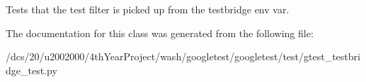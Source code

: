 \begin{DoxyVerb}Tests that the test filter is picked up from the testbridge env var.\end{DoxyVerb}
 

The documentation for this class was generated from the following file\+:\begin{DoxyCompactItemize}
\item 
/dcs/20/u2002000/4th\+Year\+Project/wash/googletest/googletest/test/gtest\+\_\+testbridge\+\_\+test.\+py\end{DoxyCompactItemize}
